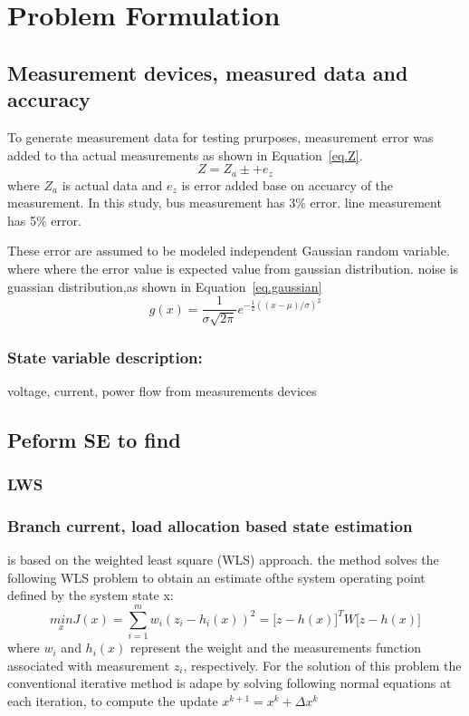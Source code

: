 \section{Problem Formulation}

\subsection{Measurement devices, measured data and accuracy}

To generate measurement data for testing prurposes, measurement error was added to tha actual measurements as shown in Equation~\ref{eq.Z}.
\begin{equation}
  Z=Z_{a} \pm +e_{z}
\label{eq.Z}
\end{equation}
where $Z_{a}$ is actual data and $e_{z}$ is error added base on accuarcy of the measurement.
In this study, bus measurement has 3$\%$ error. line measurement has 5$\%$ error.

These error are assumed to be modeled independent Gaussian random variable\cite{b2}.
where where the error value is expected value from gaussian distribution.
noise is guassian distribution,as shown in Equation~\ref{eq.gaussian}
\begin{equation}
  g(x)=\frac{1}{\sigma \sqrt{2\pi}}e^{-\frac{1}{2}((x-\mu)/\sigma)^2}
  \label{eq.gaussian}
\end{equation}
\subsubsection{State variable description:} voltage, current, power flow from measurements devices

\subsection{Peform SE to find }

\subsubsection{LWS}

\subsubsection{Branch current, load allocation based state estimation}
is based on the weighted least square (WLS) approach\cite{b1}.
the method solves the following WLS problem to obtain an estimate ofthe system operating point defined by the system state x:
\begin{equation}
  \underset{x}{min} J(x)=\sum_{i=1}^{m}w_{i}(z_{i}-h_{i}(x))^{2}=\big[ z-h(x)\big]^{T}W\big[z-h(x)\big]
\label{eq.jacobian}
\end{equation}
where $w_{i}$ and $h_{i}(x)$ represent the weight and the measurements function associated with measurement $z_{i}$, respectively.
For the solution of this problem the conventional iterative method is adape by solving following normal equations at each iteration, to compute the update $x^{k+1}=x^{k}+\Delta x^{k}$

